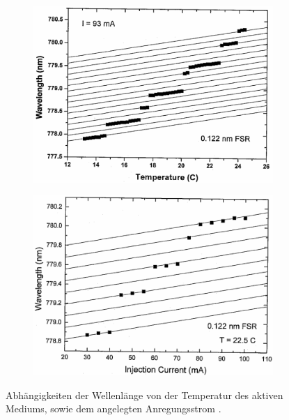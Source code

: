 \begin{figure}[htb]
  \begin{subfigure}[c]{0.5\textwidth}
    \includegraphics[width=\textwidth, angle=1, origin=c]{images/temp-lambda.pdf}
    \label{fig:temp_lambda}
  \end{subfigure}
  \begin{subfigure}[c]{0.5\textwidth}
    \includegraphics[width=\textwidth, angle=1, origin=c]{images/strom-lambda.pdf}
    \label{fig:strom_lambda}
  \end{subfigure}
  \caption{Abhängigkeiten der Wellenlänge von der Temperatur des aktiven Mediums,
  sowie dem angelegten Anregungsstrom \cite{anleitung}.}
\end{figure}


